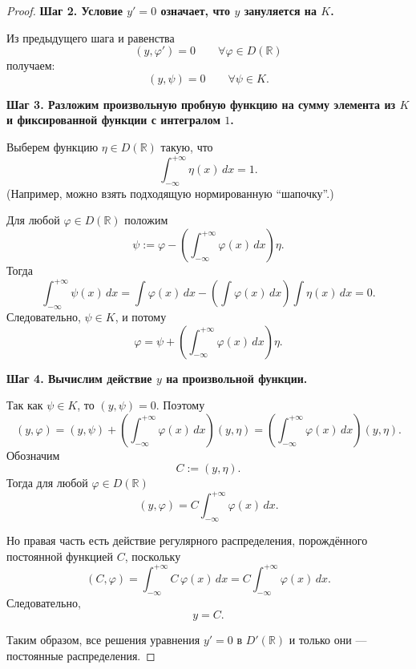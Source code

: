 \begin{proof}
	\medskip
	\textbf{Шаг 2. Условие $y'=0$ означает, что $y$ зануляется на $K$.}
	
	Из предыдущего шага и равенства
	\[
	(y,\varphi')=0 \qquad \forall \varphi \in D(\mathbb{R})
	\]
	получаем:
	\[
	(y,\psi)=0 \qquad \forall \psi \in K.
	\]
	
	\medskip
	\textbf{Шаг 3. Разложим произвольную пробную функцию на сумму элемента из $K$ и фиксированной функции с интегралом $1$.}
	
	Выберем функцию $\eta \in D(\mathbb{R})$ такую, что
	\[
	\int_{-\infty}^{+\infty}\eta(x)\,dx = 1.
	\]
	(Например, можно взять подходящую нормированную ``шапочку''.)
	
	Для любой $\varphi \in D(\mathbb{R})$ положим
	\[
	\psi := \varphi - \left(\int_{-\infty}^{+\infty}\varphi(x)\,dx\right)\eta.
	\]
	Тогда
	\[
	\int_{-\infty}^{+\infty}\psi(x)\,dx
	=
	\int \varphi(x)\,dx
	-
	\left(\int \varphi(x)\,dx\right)\int \eta(x)\,dx
	=
	0.
	\]
	Следовательно, $\psi \in K$, и потому
	\[
	\varphi
	=
	\psi + \left(\int_{-\infty}^{+\infty}\varphi(x)\,dx\right)\eta.
	\]
	
	\medskip
	\textbf{Шаг 4. Вычислим действие $y$ на произвольной функции.}
	
	Так как $\psi \in K$, то $(y,\psi)=0$. Поэтому
	\[
	(y,\varphi)
	=
	(y,\psi)
	+
	\left(\int_{-\infty}^{+\infty}\varphi(x)\,dx\right)(y,\eta)
	=
	\left(\int_{-\infty}^{+\infty}\varphi(x)\,dx\right)(y,\eta).
	\]
	Обозначим
	\[
	C := (y,\eta).
	\]
	Тогда для любой $\varphi \in D(\mathbb{R})$
	\[
	(y,\varphi)
	=
	C \int_{-\infty}^{+\infty}\varphi(x)\,dx.
	\]
	
	Но правая часть есть действие регулярного распределения, порождённого постоянной функцией $C$, поскольку
	\[
	(C,\varphi)=\int_{-\infty}^{+\infty} C\,\varphi(x)\,dx
	=
	C \int_{-\infty}^{+\infty}\varphi(x)\,dx.
	\]
	Следовательно,
	\[
	y=C.
	\]
	
	Таким образом, все решения уравнения $y'=0$ в $D'(\mathbb{R})$ и только они --- постоянные распределения.
\end{proof}


